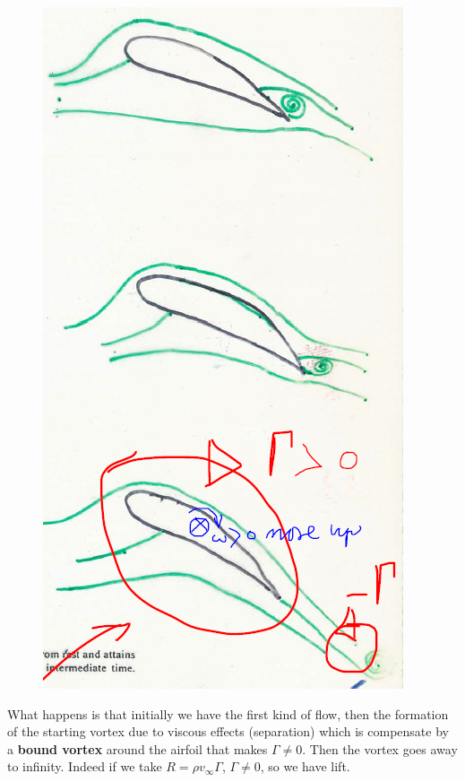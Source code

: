 		\begin{figure}
		\vspace{-5mm}
		\includegraphics[scale=0.35]{ch1/5}
		\end{figure}
		What happens is that initially we have the first kind of flow, then the formation of the starting vortex due to viscous effects (separation) which is compensate by a \textbf{bound vortex} around the airfoil that makes $\Gamma \neq 0$. Then the vortex goes away to infinity. Indeed if we take $R = \rho v_\infty \Gamma$, $\Gamma \neq 0$, so we have lift. 